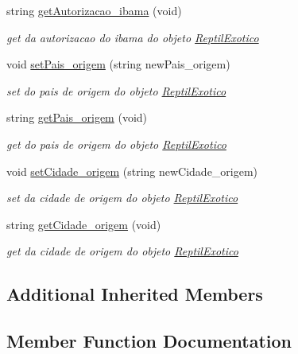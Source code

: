 \begin{DoxyCompactItemize}
string \mbox{\hyperlink{class_reptil_exotico_a33de0c7f7157129bc2f121ac12b75f6c}{get\+Autorizacao\+\_\+ibama}} (void)
\begin{DoxyCompactList}\small\item\em get da autorizacao do ibama do objeto \mbox{\hyperlink{class_reptil_exotico}{Reptil\+Exotico}} \end{DoxyCompactList}\item 
void \mbox{\hyperlink{class_reptil_exotico_af564906886dfd2a83e253155a84b8cae}{set\+Pais\+\_\+origem}} (string new\+Pais\+\_\+origem)
\begin{DoxyCompactList}\small\item\em set do pais de origem do objeto \mbox{\hyperlink{class_reptil_exotico}{Reptil\+Exotico}} \end{DoxyCompactList}\item 
string \mbox{\hyperlink{class_reptil_exotico_a99f779d15b33ab9c8d0506d4e5b8af6e}{get\+Pais\+\_\+origem}} (void)
\begin{DoxyCompactList}\small\item\em get do pais de origem do objeto \mbox{\hyperlink{class_reptil_exotico}{Reptil\+Exotico}} \end{DoxyCompactList}\item 
void \mbox{\hyperlink{class_reptil_exotico_a06ab0bc9e68279fe681b781c14b4917d}{set\+Cidade\+\_\+origem}} (string new\+Cidade\+\_\+origem)
\begin{DoxyCompactList}\small\item\em set da cidade de origem do objeto \mbox{\hyperlink{class_reptil_exotico}{Reptil\+Exotico}} \end{DoxyCompactList}\item 
string \mbox{\hyperlink{class_reptil_exotico_af1b3d94b7d6ca00f327a67b3e21a6eff}{get\+Cidade\+\_\+origem}} (void)
\begin{DoxyCompactList}\small\item\em get da cidade de origem do objeto \mbox{\hyperlink{class_reptil_exotico}{Reptil\+Exotico}} \end{DoxyCompactList}\end{DoxyCompactItemize}
\subsection*{Additional Inherited Members}


\subsection{Member Function Documentation}
\mbox{\label{class_reptil_exotico_a33de0c7f7157129bc2f121ac12b75f6c}} 
